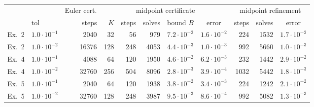 \setlength{\tabcolsep}{3.2pt}\footnotesize\begin{tabular}{llr|rrrcc|rrc}
\hline
 & & Euler cert. & \multicolumn{5}{c}{midpoint certificate} & \multicolumn{3}{c}{midpoint refinement} \\
 & tol & steps & $K$ & steps & solves & bound $B$ & error & steps & solves & error \\
\hline
Ex.~2 & $1.0\!\cdot\!10^{-1}$ & 2040 & 32 & 56 & 979 & $7.2\!\cdot\!10^{-2}$ & $1.6\!\cdot\!10^{-2}$ & 224 & 1532 & $1.7\!\cdot\!10^{-2}$ \\
Ex.~2 & $1.0\!\cdot\!10^{-2}$ & 16376 & 128 & 248 & 4053 & $4.4\!\cdot\!10^{-3}$ & $1.0\!\cdot\!10^{-3}$ & 992 & 5660 & $1.0\!\cdot\!10^{-3}$ \\
Ex.~4 & $1.0\!\cdot\!10^{-1}$ & 4088 & 64 & 120 & 1950 & $4.6\!\cdot\!10^{-2}$ & $6.2\!\cdot\!10^{-3}$ & 232 & 1442 & $2.9\!\cdot\!10^{-2}$ \\
Ex.~4 & $1.0\!\cdot\!10^{-2}$ & 32760 & 256 & 504 & 8096 & $2.8\!\cdot\!10^{-3}$ & $3.9\!\cdot\!10^{-4}$ & 1032 & 5442 & $1.8\!\cdot\!10^{-3}$ \\
Ex.~5 & $1.0\!\cdot\!10^{-1}$ & 2040 & 64 & 120 & 1938 & $3.8\!\cdot\!10^{-2}$ & $3.4\!\cdot\!10^{-3}$ & 224 & 1242 & $2.1\!\cdot\!10^{-2}$ \\
Ex.~5 & $1.0\!\cdot\!10^{-2}$ & 32760 & 128 & 248 & 3987 & $9.5\!\cdot\!10^{-3}$ & $8.6\!\cdot\!10^{-4}$ & 992 & 5082 & $1.3\!\cdot\!10^{-3}$ \\
\hline
\end{tabular}
